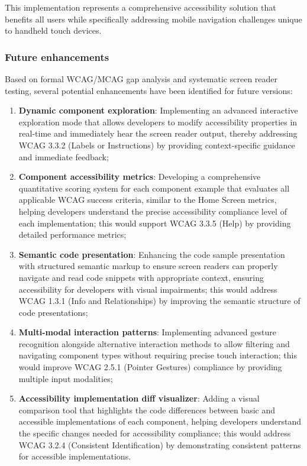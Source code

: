 This implementation represents a comprehensive accessibility solution that benefits all users while specifically addressing mobile navigation challenges unique to handheld touch devices.

\subsubsection{Future enhancements}

Based on formal WCAG/MCAG gap analysis and systematic screen reader testing, several potential enhancements have been identified for future versions:

\begin{enumerate}
    \item \textbf{Dynamic component exploration}: Implementing an advanced interactive exploration mode that allows developers to modify accessibility properties in real-time and immediately hear the screen reader output, thereby addressing WCAG 3.3.2 (Labels or Instructions) by providing context-specific guidance and immediate feedback;
    
    \item \textbf{Component accessibility metrics}: Developing a comprehensive quantitative scoring system for each component example that evaluates all applicable WCAG success criteria, similar to the Home Screen metrics, helping developers understand the precise accessibility compliance level of each implementation; this would support WCAG 3.3.5 (Help) by providing detailed performance metrics;
    
    \item \textbf{Semantic code presentation}: Enhancing the code sample presentation with structured semantic markup to ensure screen readers can properly navigate and read code snippets with appropriate context, ensuring accessibility for developers with visual impairments; this would address WCAG 1.3.1 (Info and Relationships) by improving the semantic structure of code presentations;
    
    \item \textbf{Multi-modal interaction patterns}: Implementing advanced gesture recognition alongside alternative interaction methods to allow filtering and navigating component types without requiring precise touch interaction; this would improve WCAG 2.5.1 (Pointer Gestures) compliance by providing multiple input modalities;
    
    \item \textbf{Accessibility implementation diff visualizer}: Adding a visual comparison tool that highlights the code differences between basic and accessible implementations of each component, helping developers understand the specific changes needed for accessibility compliance; this would address WCAG 3.2.4 (Consistent Identification) by demonstrating consistent patterns for accessible implementations.
\end{enumerate}

